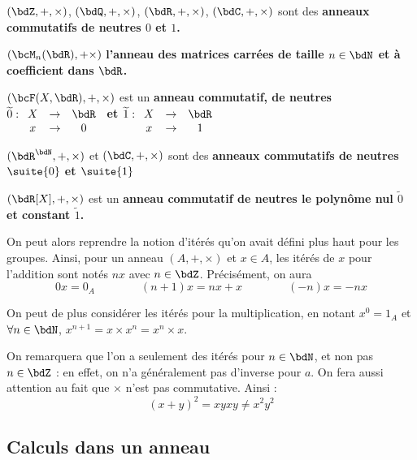 \documentclass[a4paper,french,bookmarks]{article}
\begin{document}
\begin{example}{}{}
    \begin{enumerate}
        \ithand $(\bdZ, +, \times)$, $(\bdQ, +, \times)$, $(\bdR, +, \times)$, $(\bdC, +, \times)$ sont des \bf{anneaux commutatifs} de neutres $0$ et $1$.
        
        \ithand $(\bcM_n(\bdR), + \times)$ \bf{l'anneau des matrices carrées} \textit{} de taille $n \in \bdN$ et à coefficient dans $\bdR$.
        
        \ithand $(\bcF(X, \bdR), +, \times)$ est un \bf{anneau commutatif}, de neutres $\widetilde{0}: \begin{array}[t]{ccc}
            X &\to& \bdR  \\
            x &\to& 0 
        \end{array}$ et $\widetilde{1}: \begin{array}[t]{ccc}
            X &\to& \bdR  \\
            x &\to& 1 
        \end{array}$
        
        \ithand $(\bdR^\bdN, +, \times)$ et $(\bdC, +, \times)$ sont des \bf{anneaux commutatifs} de neutres $\suite{0}$ et $\suite{1}$
        
        \ithand $(\bdR[X], +, \times)$ est un \bf{anneau commutatif} de neutres le polynôme nul $\widetilde 0$ et constant $\widetilde 1$. 
    \end{enumerate}

\end{example}


On peut alors reprendre la notion d'itérés qu'on avait défini plus haut pour les groupes. Ainsi, pour un anneau $(A, +, \times)$ et $x \in A$, les itérés de $x$ pour l'addition sont notés $nx$ avec $n \in \bdZ$. Précisément, on aura 
\[ 0x = 0_A \qquad\qquad (n+1)x = nx + x \qquad\qquad (-n)x = -nx \]

On peut de plus considérer les itérés pour la multiplication, en notant $x^0 = 1_A$ et $\forall n \in \bdN$, $x^{n+1} = x \times x^n = x^n \times x$.

On remarquera que l'on a seulement des itérés pour $n \in \bdN$, et non pas $n \in \bdZ$ : en effet, on n'a généralement pas d'inverse pour $a$. On fera aussi attention au fait que $\times$ n'est pas commutative. Ainsi :
\[ (x+y)^2 = xyxy \neq x^2y^2\]

\subsection{Calculs dans un anneau}
\end{document}
